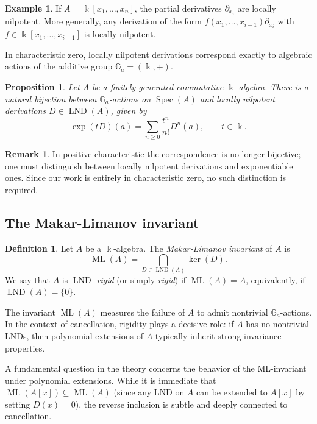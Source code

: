 \documentclass{amsart}
\theoremstyle{plain}
\newtheorem{proposition}[theorem]{Proposition}
\numberwithin{theorem}{section}
\numberwithin{equation}{theorem}
\theoremstyle{definition}
\newtheorem{definition}[theorem]{Definition}
\newtheorem{example}[theorem]{Example}
\newtheorem{remark}[theorem]{Remark}
\DeclareMathOperator{\Spec}{Spec}
\DeclareMathOperator{\LND}{LND}
\DeclareMathOperator{\ML}{ML}
\begin{document}
\begin{example}
If $A=\Bbbk[x_1,\dots,x_n]$, the partial derivatives $\partial_{x_i}$ are locally nilpotent. More generally, any derivation of the form $f(x_1,\dots,x_{i-1})\partial_{x_i}$ with $f\in \Bbbk[x_1,\dots,x_{i-1}]$ is locally nilpotent.
\end{example}

In characteristic zero, locally nilpotent derivations correspond exactly to algebraic actions of the additive group $\mathbb{G}_a=(\Bbbk,+)$.

\begin{proposition}\cite[Theorem 1.3]{Freudenburg2006}
\label{prop:Gacorr}
Let $A$ be a finitely generated commutative $\Bbbk$-algebra.  
There is a natural bijection between $\mathbb{G}_a$-actions on $\Spec(A)$ and locally nilpotent derivations $D\in \LND(A)$, given by
\[
\exp(tD)(a)=\sum_{n\ge 0}\frac{t^n}{n!}D^n(a),\qquad t\in\Bbbk .
\]
\end{proposition}

\begin{remark}
In positive characteristic the correspondence is no longer bijective; one must distinguish between locally nilpotent derivations and exponentiable ones.  
Since our work is entirely in characteristic zero, no such distinction is required.
\end{remark}

\subsection{The Makar-Limanov invariant}

\begin{definition}
Let $A$ be a $\Bbbk$-algebra.  
The \emph{Makar-Limanov invariant} of $A$ is
\[
\ML(A)=\bigcap_{D\in\LND(A)}\ker(D).
\]
We say that $A$ is \emph{$\LND$-rigid} (or simply \emph{rigid}) if $\ML(A)=A$, equivalently, if $\LND(A)=\{0\}$.
\end{definition}

The invariant $\ML(A)$ measures the failure of $A$ to admit nontrivial $\mathbb{G}_a$-actions.  
In the context of cancellation, rigidity plays a decisive role: if $A$ has no nontrivial LNDs, then polynomial extensions of $A$ typically inherit strong invariance properties.

A fundamental question in the theory concerns the behavior of the ML-invariant under polynomial extensions. While it is immediate that $\ML(A[x]) \subseteq \ML(A)$ (since any LND on $A$ can be extended to $A[x]$ by setting $D(x)=0$), the reverse inclusion is subtle and deeply connected to cancellation.
\end{document}
